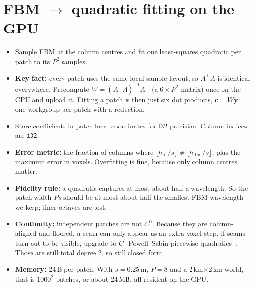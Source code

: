 \documentclass[11pt]{article}
\begin{document}
\section{FBM $\rightarrow$ quadratic fitting on the GPU}\label{sec:fit}
\begin{itemize}
\item Sample FBM at the column centres and fit one least-squares quadratic per patch to its $P^2$ samples.
\item \textbf{Key fact:} every patch uses the same local sample layout, so $A^\top A$ is identical everywhere. Precompute $W=(A^\top A)^{-1}A^\top$ (a $6\times P^2$ matrix) once on the CPU and upload it. Fitting a patch is then just six dot products, $\mathbf c=W\mathbf y$: one workgroup per patch with a reduction.
\item Store coefficients in patch-local coordinates for f32 precision. Column indices are \texttt{i32}.
\item \textbf{Error metric:} the fraction of columns where $\lfloor h_{\text{fit}}/s\rfloor\ne\lfloor h_{\text{fbm}}/s\rfloor$, plus the maximum error in voxels. Overfitting is fine, because only column centres matter.
\item \textbf{Fidelity rule:} a quadratic captures at most about half a wavelength. So the patch width $P s$ should be at most about half the smallest FBM wavelength we keep; finer octaves are lost.
\item \textbf{Continuity:} independent patches are not $C^0$. Because they are column-aligned and floored, a seam can only appear as an extra voxel step. If seams turn out to be visible, upgrade to $C^1$ Powell--Sabin piecewise quadratics~\cite{ps}. Those are still total degree 2, so still closed form.
\item \textbf{Memory:} 24\,B per patch. With $s=0.25$\,m, $P=8$ and a 2\,km$\times$2\,km world, that is $1000^2$ patches, or about 24\,MB, all resident on the GPU.
\end{itemize}
\end{document}
